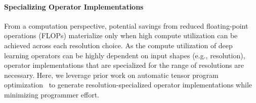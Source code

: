 \paragraph{Specializing Operator Implementations}
From a computation perspective, potential savings from reduced floating-point operations (FLOPs) materialize only when high compute utilization can be achieved across each resolution choice.
As the compute utilization of deep learning operators can be highly dependent on input shapes (e.g., resolution), operator implementations that are specialized for the range of resolutions are necessary.
Here, we leverage prior work on automatic tensor program optimization~\cite{chen2018learning, ragan2013halide} to generate resolution-specialized operator implementations while minimizing programmer effort.





